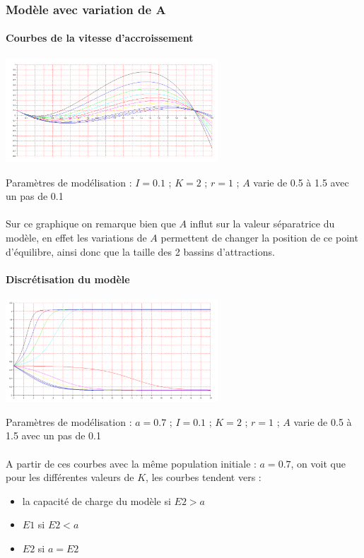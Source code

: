 \documentclass{article}
\begin{document}
\newpage

\subsubsection{Modèle avec variation de A}

\paragraph{Courbes de la vitesse d'accroissement}
\begin{center}
\includegraphics[width=300px]{img/part1/AlleeA.png}
\end{center}
Paramètres de modélisation : $I=0.1$ ; $K=2$ ; $r=1$  ; $A$ varie de 0.5 à 1.5 avec un pas de 0.1
\paragraph{}
Sur ce graphique on remarque bien que $A$ influt sur la valeur séparatrice du modèle, en effet les variations de $A$ permettent de changer la position de ce point d'équilibre, ainsi donc que la taille des 2 bassins d'attractions.

\paragraph{Discrétisation du modèle}
\begin{center}
\includegraphics[width=300px]{img/part1/TrajA.png}
\end{center}
Paramètres de modélisation : $a=0.7$ ; $I=0.1$ ; $K=2$ ; $r=1$  ; $A$ varie de 0.5 à 1.5 avec un pas de 0.1
\paragraph{}
A partir de ces courbes avec la même population initiale : $a=0.7$, on voit que pour les différentes valeurs de $K$, les courbes tendent vers :
\begin{itemize}
\item la capacité de charge du modèle si $E2 > a$
\item $E1$ si $E2<a$
\item $E2$ si $a=E2$
\end{itemize}
\end{document}
